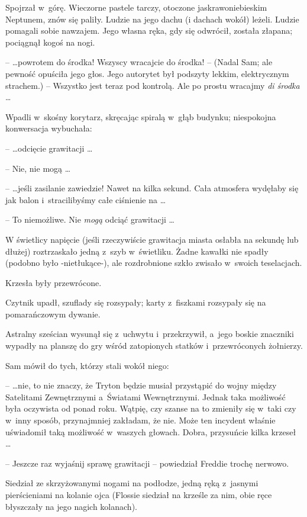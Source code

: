\documentclass[oneside,polish,11pt,rmheadings]{mwbk}
\begin{document}
Spojrzał w~górę. Wieczorne pastele tarczy, otoczone jaskrawoniebieskim Neptunem, znów się paliły. Ludzie na jego dachu (i dachach wokół) leżeli. Ludzie pomagali sobie nawzajem. Jego własna ręka, gdy się odwrócił, została złapana; pociągnął kogoś na nogi. 

--  \ldots  powrotem do środka! Wszyscy wracajcie do środka! -- (Nadal Sam; ale pewność opuściła jego głos. Jego autorytet był podszyty lekkim, elektrycznym strachem.) -- Wszystko jest teraz pod kontrolą. Ale po prostu wracajmy \textit{di środka} \ldots  

Wpadli w~skośny korytarz, skręcając spiralą w~głąb budynku; niespokojna konwersacja wybuchała: 

-- \ldots  odcięcie grawitacji \ldots  

-- Nie, nie mogą  \ldots  

--  \ldots  jeśli zasilanie zawiedzie! Nawet na kilka sekund. Cała atmosfera wydęłaby się jak balon i~stracilibyśmy całe ciśnienie na \ldots 

-- To niemożliwe. Nie \textit{mogą } odciąć grawitacji \ldots  

W świetlicy napięcie (jeśli rzeczywiście grawitacja miasta osłabła na sekundę lub dłużej) roztrzaskało jedną z~szyb w~świetliku. Żadne kawałki nie spadły (podobno było -nietłukące-), ale rozdrobnione szkło zwisało w~swoich teselacjach. 

Krzesła były przewrócone. 

Czytnik upadł, szuflady się rozsypały; karty z~fiszkami rozsypały się na pomarańczowym dywanie. 

Astralny sześcian wysunął się z~uchwytu i~przekrzywił, a~jego boskie znaczniki wypadły na planszę do gry wśród zatopionych statków i~przewróconych żołnierzy.  

Sam mówił do tych, którzy stali wokół niego: 

--  \ldots nie, to nie znaczy, że Tryton będzie musiał przystąpić do wojny między Satelitami Zewnętrznymi a~Światami Wewnętrznymi. Jednak taka możliwość była oczywista od ponad roku. Wątpię, czy szanse na to zmieniły się w~taki czy w~inny sposób, przynajmniej zakładam, że nie. Może ten incydent właśnie uświadomił taką możliwość w~waszych głowach. Dobra, przysuńcie kilka krzeseł \ldots  

-- Jeszcze raz wyjaśnij sprawę grawitacji -- powiedział Freddie trochę nerwowo.

 Siedział ze skrzyżowanymi nogami na podłodze, jedną ręką z~jasnymi pierścieniami na kolanie ojca (Flossie siedział na krześle za nim, obie ręce błyszczały na jego nagich kolanach). 
 
\end{document}
